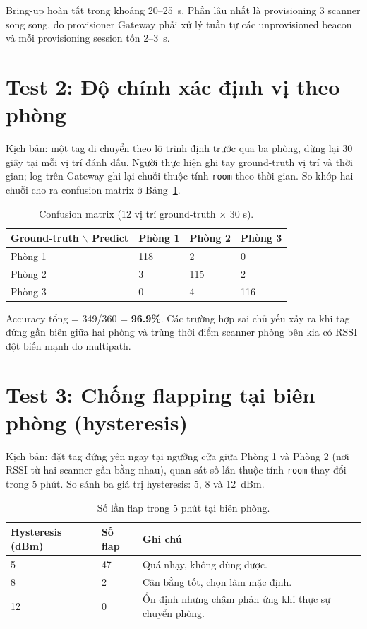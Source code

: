 Bring-up hoàn tất trong khoảng 20--25~s. Phần lâu nhất là provisioning 3 scanner song song, do provisioner Gateway phải xử lý tuần tự các unprovisioned beacon và mỗi provisioning session tốn 2--3~s.

\section{Test 2: Độ chính xác định vị theo phòng}

Kịch bản: một tag di chuyển theo lộ trình định trước qua ba phòng, dừng lại 30 giây tại mỗi vị trí đánh dấu. Người thực hiện ghi tay ground-truth vị trí và thời gian; log trên Gateway ghi lại chuỗi thuộc tính \texttt{room} theo thời gian. So khớp hai chuỗi cho ra confusion matrix ở Bảng~\ref{tab:confusion}.

\begin{table}[htp]
    \centering
    \caption{Confusion matrix (12 vị trí ground-truth $\times$ 30 s).}
    \label{tab:confusion}
    \begin{tabular}{llll}
        \hline
        \textbf{Ground-truth $\backslash$ Predict} & \textbf{Phòng 1} & \textbf{Phòng 2} & \textbf{Phòng 3} \\
        \hline
        Phòng 1 & 118 & 2 & 0 \\
        Phòng 2 & 3 & 115 & 2 \\
        Phòng 3 & 0 & 4 & 116 \\
        \hline
    \end{tabular}
\end{table}

Accuracy tổng = 349/360 = \textbf{96.9\%}. Các trường hợp sai chủ yếu xảy ra khi tag đứng gần biên giữa hai phòng và trùng thời điểm scanner phòng bên kia có RSSI đột biến mạnh do multipath.

\section{Test 3: Chống flapping tại biên phòng (hysteresis)}

Kịch bản: đặt tag đứng yên ngay tại ngưỡng cửa giữa Phòng 1 và Phòng 2 (nơi RSSI từ hai scanner gần bằng nhau), quan sát số lần thuộc tính \texttt{room} thay đổi trong 5 phút. So sánh ba giá trị hysteresis: 5, 8 và 12~dBm.

\begin{table}[htp]
    \centering
    \caption{Số lần flap trong 5 phút tại biên phòng.}
    \label{tab:hysteresis}
    \begin{tabular}{lll}
        \hline
        \textbf{Hysteresis (dBm)} & \textbf{Số flap} & \textbf{Ghi chú} \\
        \hline
        5  & 47 & Quá nhạy, không dùng được. \\
        8  & 2  & Cân bằng tốt, chọn làm mặc định. \\
        12 & 0  & Ổn định nhưng chậm phản ứng khi thực sự chuyển phòng. \\
        \hline
    \end{tabular}
\end{table}

